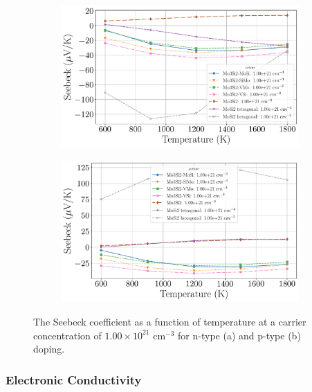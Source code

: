 \documentclass[7.5pt]{article}
\theoremstyle{plain}
\theoremstyle{definition}
\newcommand{\<}{\langle}
\renewcommand{\>}{\rangle}
\begin{document}
\begin{figure}
\centering
\begin{subfigure}{.5\textwidth}
  \centering
  \includegraphics[width=\linewidth]{allmats_S_temp_doping_n}
  \caption{}
  \label{fig:sub1}
\end{subfigure}%
\begin{subfigure}{.5\textwidth}
  \centering
  \includegraphics[width=\linewidth]{allmats_S_temp_doping_p}
  \caption{}
  \label{fig:sub2}
\end{subfigure}
\caption{The Seebeck coefficient as a function of temperature at a carrier concentration of $1.00 \times 10^{21}$ cm$^{-3}$ for n-type (a) and p-type (b) doping.}
\label{fig:S-Temp}
\end{figure}

\clearpage
\subsubsection{Electronic Conductivity}
\end{document}
